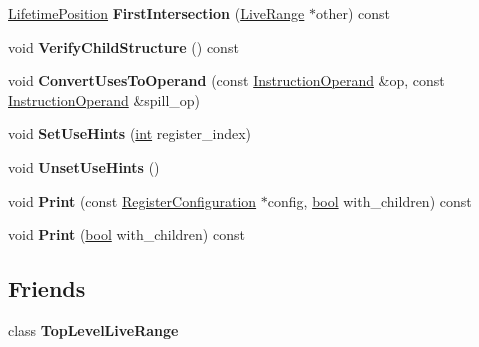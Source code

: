 \begin{DoxyCompactItemize}
\mbox{\hyperlink{classv8_1_1internal_1_1compiler_1_1LifetimePosition}{Lifetime\+Position}} {\bfseries First\+Intersection} (\mbox{\hyperlink{classv8_1_1internal_1_1compiler_1_1LiveRange}{Live\+Range}} $\ast$other) const
\item 
\mbox{\label{classv8_1_1internal_1_1compiler_1_1LiveRange_a998a8309a27c54f23e29d9d653fdc3d5}} 
void {\bfseries Verify\+Child\+Structure} () const
\item 
\mbox{\label{classv8_1_1internal_1_1compiler_1_1LiveRange_a9692c1a6751d90ffe208ce6d7a68ed49}} 
void {\bfseries Convert\+Uses\+To\+Operand} (const \mbox{\hyperlink{classv8_1_1internal_1_1compiler_1_1InstructionOperand}{Instruction\+Operand}} \&op, const \mbox{\hyperlink{classv8_1_1internal_1_1compiler_1_1InstructionOperand}{Instruction\+Operand}} \&spill\+\_\+op)
\item 
\mbox{\label{classv8_1_1internal_1_1compiler_1_1LiveRange_a8eedd6d46ccdb74dbecbf6f498db1603}} 
void {\bfseries Set\+Use\+Hints} (\mbox{\hyperlink{classint}{int}} register\+\_\+index)
\item 
\mbox{\label{classv8_1_1internal_1_1compiler_1_1LiveRange_a1fcf65b7ec0fc8d55652f95a77f73295}} 
void {\bfseries Unset\+Use\+Hints} ()
\item 
\mbox{\label{classv8_1_1internal_1_1compiler_1_1LiveRange_a212e563486630a6fa386e05a108188e6}} 
void {\bfseries Print} (const \mbox{\hyperlink{classv8_1_1internal_1_1RegisterConfiguration}{Register\+Configuration}} $\ast$config, \mbox{\hyperlink{classbool}{bool}} with\+\_\+children) const
\item 
\mbox{\label{classv8_1_1internal_1_1compiler_1_1LiveRange_a692f1734eb2db5e65cb6e7313defcbe6}} 
void {\bfseries Print} (\mbox{\hyperlink{classbool}{bool}} with\+\_\+children) const
\end{DoxyCompactItemize}
\subsection*{Friends}
\begin{DoxyCompactItemize}
\item 
\mbox{\label{classv8_1_1internal_1_1compiler_1_1LiveRange_a129402ecd87e17260440c4799385799b}} 
class {\bfseries Top\+Level\+Live\+Range}
\end{DoxyCompactItemize}



